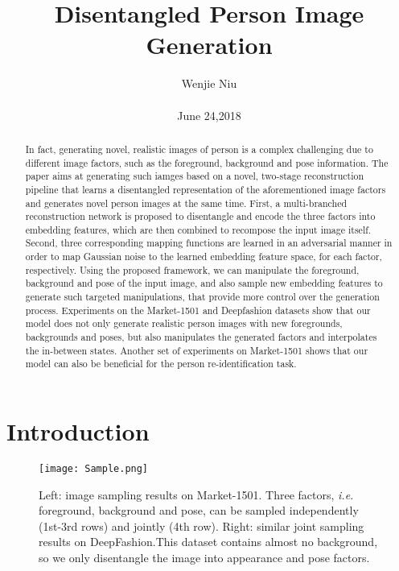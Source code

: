 \documentclass[10pt,twocolumn,letterpaper]{article}
\begin{document}
\title{Disentangled Person Image Generation}

\author{Wenjie Niu\\\\ June 24,2018}

\maketitle

\begin{abstract}
In fact, generating novel, realistic images of person is a complex challenging due to different image factors, such as the foreground, background and pose information. The paper aims at generating such iamges based on a novel, two-stage reconstruction pipeline that learns a disentangled representation of the aforementioned image factors and generates novel person images at the same time. First, a multi-branched reconstruction network is proposed to disentangle and encode the three factors into embedding features, which are then combined to recompose the input image itself. Second, three corresponding mapping functions are learned in an adversarial manner in order to map Gaussian noise to the learned embedding feature space, for each factor, respectively. Using the proposed framework, we can manipulate the foreground,
background and pose of the input image, and also sample new embedding features to generate such targeted
manipulations, that provide more control over the generation process. Experiments on the Market-1501 and Deepfashion datasets show that our model does not only generate realistic person images with new foregrounds, backgrounds and poses, but also manipulates the generated factors and interpolates the in-between states. Another set of experiments on Market-1501 shows that our model can also be beneficial for the person re-identification task.~\cite{Ma_2018_CVPR}
\end{abstract}

\section{Introduction}
\begin{figure}[!htp]
\begin{center}
   \texttt{[image: Sample.png]}
\end{center}
   \caption{Left: image sampling results on Market-1501.
Three factors, \emph{i.e.} foreground, background and pose, can be
sampled independently (1st-3rd rows) and jointly (4th row).
Right: similar joint sampling results on DeepFashion.This
dataset contains almost no background, so we only disentangle
the image into appearance and pose factors.~\cite{Ma_2018_CVPR}}
\label{fig:Sample}
\end{figure}
\end{document}
